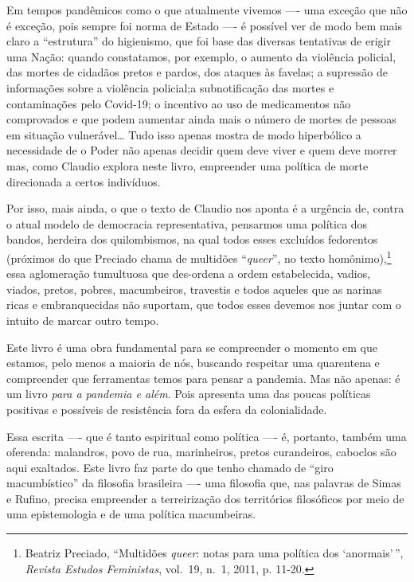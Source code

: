 Em tempos pandêmicos como o que atualmente vivemos ---- uma exceção que
não é exceção, pois sempre foi norma de Estado ---- é possível ver de modo
bem mais claro a ``estrutura'' do higienismo, que foi base das diversas
tentativas de erigir uma Nação: quando constatamos, por exemplo, o
aumento da violência policial, das mortes de cidadãos pretos e pardos,
dos ataques às favelas; a supressão de informações sobre a violência
policial;a subnotificação das mortes e contaminações pelo Covid-19; o
incentivo ao uso de medicamentos não comprovados e que podem aumentar
ainda mais o número de mortes de pessoas em situação vulnerável\ldots{}
Tudo isso apenas mostra de modo hiperbólico a necessidade de o Poder não
apenas decidir quem deve viver e quem deve morrer mas, como Claudio
explora neste livro, empreender uma política de morte direcionada a
certos indivíduos.

Por isso, mais ainda, o que o texto de Claudio nos aponta é a urgência
de, contra o atual modelo de democracia representativa, pensarmos uma
política dos bandos, herdeira dos quilombismos, na qual todos esses
excluídos fedorentos (próximos do que Preciado chama de multidões
``\textit{queer}'', no texto homônimo),\footnote{Beatriz Preciado,
  ``Multidões \textit{queer}: notas para uma política dos `anormais'\,'',
  \textit{Revista Estudos Feministas}, vol.~19, n.~1, 2011, p. 11-20.}
essa aglomeração tumultuosa que des-ordena a ordem estabelecida, vadios,
viados, pretos, pobres, macumbeiros, travestis e todos aqueles que as
narinas ricas e embranquecidas não suportam, que todos esses devemos nos
juntar com o intuito de marcar outro tempo.

Este livro é uma obra fundamental para se compreender o momento em que
estamos, pelo menos a maioria de nós, buscando respeitar uma quarentena
e compreender que ferramentas temos para pensar a pandemia. Mas não
apenas: é um livro \textit{para a pandemia e além}. Pois apresenta uma das
poucas políticas positivas e possíveis de resistência fora da esfera da
colonialidade.

Essa escrita ---- que é tanto espiritual como política ---- é, portanto,
também uma oferenda: malandros, povo de rua, marinheiros, pretos
curandeiros, caboclos são aqui exaltados. Este livro faz parte do que
tenho chamado de ``giro macumbístico'' da filosofia brasileira ---- uma
filosofia que, nas palavras de Simas e Rufino, precisa empreender a
terreirização dos territórios filosóficos por meio de uma epistemologia
e de uma política macumbeiras.

